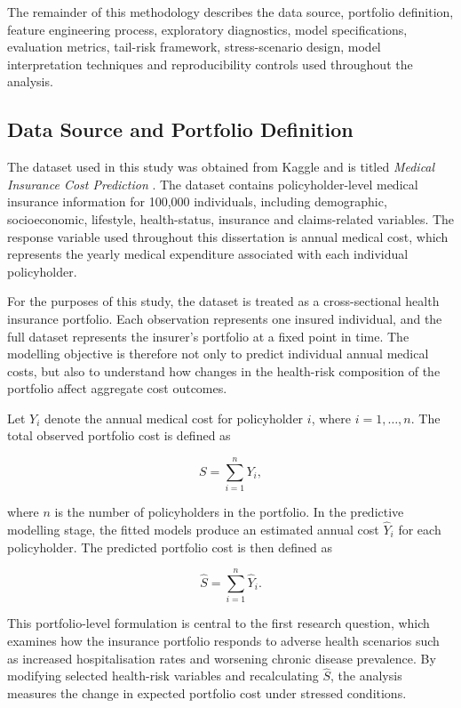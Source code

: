 \documentclass[11pt]{article}
\begin{document}
    The remainder of this methodology describes the data source, portfolio definition, feature engineering process, exploratory diagnostics, model specifications, evaluation metrics, tail-risk framework, stress-scenario design, model interpretation techniques and reproducibility controls used throughout the analysis.
    
	\subsection{Data Source and Portfolio Definition}
	
	The dataset used in this study was obtained from Kaggle and is titled \textit{Medical Insurance Cost Prediction} \cite{mohankrishnathalla_medical_insurance_cost_prediction}. The dataset contains policyholder-level medical insurance information for 100,000 individuals, including demographic, socioeconomic, lifestyle, health-status, insurance and claims-related variables. The response variable used throughout this dissertation is annual medical cost, which represents the yearly medical expenditure associated with each individual policyholder.
	
	For the purposes of this study, the dataset is treated as a cross-sectional health insurance portfolio. Each observation represents one insured individual, and the full dataset represents the insurer's portfolio at a fixed point in time. The modelling objective is therefore not only to predict individual annual medical costs, but also to understand how changes in the health-risk composition of the portfolio affect aggregate cost outcomes.
	
	Let \(Y_i\) denote the annual medical cost for policyholder \(i\), where \(i = 1, \ldots, n\). The total observed portfolio cost is defined as
	
	\begin{equation}
		S = \sum_{i=1}^{n} Y_i ,
	\end{equation}
	
	where \(n\) is the number of policyholders in the portfolio. In the predictive modelling stage, the fitted models produce an estimated annual cost \(\hat{Y}_i\) for each policyholder. The predicted portfolio cost is then defined as
	
	\begin{equation}
		\hat{S} = \sum_{i=1}^{n} \hat{Y}_i .
	\end{equation}
	
	This portfolio-level formulation is central to the first research question, which examines how the insurance portfolio responds to adverse health scenarios such as increased hospitalisation rates and worsening chronic disease prevalence. By modifying selected health-risk variables and recalculating \(\hat{S}\), the analysis measures the change in expected portfolio cost under stressed conditions.
	
\end{document}
